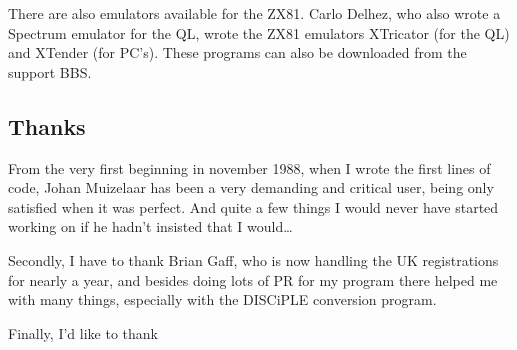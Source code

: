     There are also emulators available for the ZX81.  Carlo Delhez, who also
    wrote a Spectrum emulator for the QL, wrote the ZX81 emulators XTricator
    (for the QL) and XTender (for PC's).  These programs can also be
    downloaded from the support BBS.

\subsection{Thanks}

    From the very first beginning in november 1988, when I wrote the first
    lines of code, Johan Muizelaar has been a very demanding and critical
    user, being only satisfied when it was perfect.  And quite a few things
    I would never have started working on if he hadn't insisted that I
    would\ldots

    Secondly, I have to thank Brian Gaff, who is now handling the UK
    registrations for nearly a year, and besides doing lots of PR for my
    program there helped me with many things, especially with the DISCiPLE
    conversion program.

    Finally, I'd like to thank

